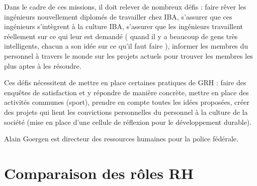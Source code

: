 \documentclass[a4paper, 12pt]{article}
\begin{document}
Dans le cadre de ces missions, il doit relever de nombreux défis : faire rêver les ingénieurs nouvellement diplomés de travailler chez IBA, s'assurer que ces ingénieurs s'intègrent à la culture IBA, s'assurer que les ingénieurs travaillent réellement sur ce qui leur est demandé (\og{} quand il y a beaucoup de gens très intelligents, chacun a son idée sur ce qu'il faut faire \fg{}), informer les membres du personnel à travers le monde sur les projets actuels pour trouver les membres les plus aptes à les résoudre.

Ces défis nécessitent de mettre en place certaines pratiques de GRH : faire des enquêtes de satisfaction et y répondre de manière concrète, mettre en place des activités communes (sport), prendre en compte toutes les idées proposées, créer des projets qui lient les convictions personnelles du personnel à la culture de la société (mise en place d'une cellule de réflexion pour le développement durable).

Alain Goergen est directeur des ressources humaines pour la police fédérale.


\section{Comparaison des rôles RH}
\end{document}
